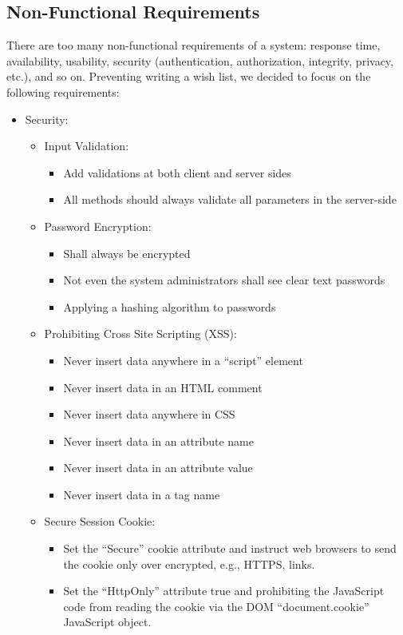 \subsection{Non-Functional Requirements}
There are too many non-functional requirements of a system: response time, availability, usability, security (authentication, authorization, integrity, privacy, etc.), and so on. Preventing writing a wish list, we decided to focus on the following requirements:
\begin{itemize}
  \item Security:
  \begin{itemize}
    \item Input Validation:
    \begin{itemize}
      \item Add validations at both client and server sides
      \item All methods should always validate all parameters in the server-side
    \end{itemize}
    \item Password Encryption:
    \begin{itemize}
      \item Shall always be encrypted
      \item Not even the system administrators shall see clear text passwords
      \item Applying a hashing algorithm to passwords
    \end{itemize}
    \item Prohibiting Cross Site Scripting (XSS):
    \begin{itemize}
      \item Never insert data anywhere in a ``script'' element
      \item Never insert data in an HTML comment
      \item Never insert data anywhere in CSS
      \item Never insert data in an attribute name
      \item Never insert data in an attribute value
      \item Never insert data in a tag name
    \end{itemize}
    \item Secure Session Cookie:
    \begin{itemize}
      \item Set the ``Secure'' cookie attribute and instruct web browsers to send the cookie only over encrypted, e.g., HTTPS, links.
      \item Set the ``HttpOnly'' attribute true and prohibiting the JavaScript code from reading the cookie via the DOM ``document.cookie'' JavaScript object.

\end{itemize}
\end{itemize}
\end{itemize}
